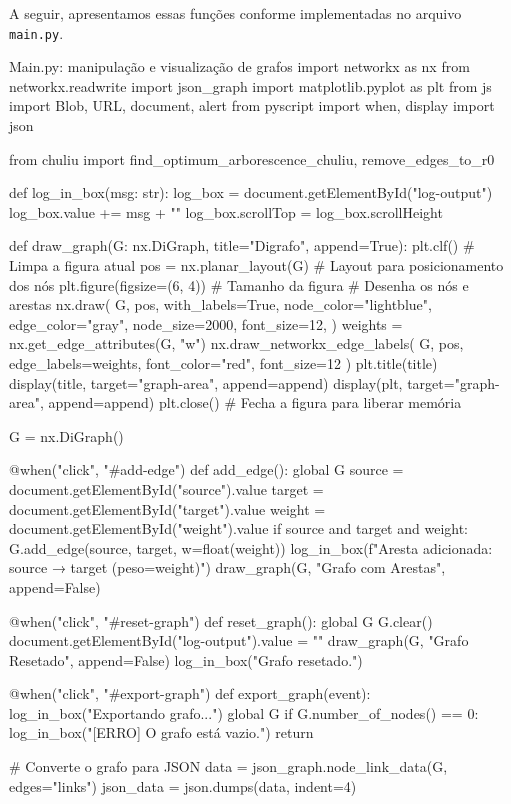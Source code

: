 A seguir, apresentamos essas funções conforme implementadas no arquivo \texttt{main.py}.

\begin{pybox}[label={lst:draw_graph}]{Main.py: manipulação e visualização de grafos}
	import networkx as nx
	from networkx.readwrite import json_graph
	import matplotlib.pyplot as plt
	from js import Blob, URL, document, alert
	from pyscript import when, display
	import json

	from chuliu import find_optimum_arborescence_chuliu, remove_edges_to_r0

	def log_in_box(msg: str):
	log_box = document.getElementById("log-output")
	log_box.value += msg + "\n"
	log_box.scrollTop = log_box.scrollHeight

	def draw_graph(G: nx.DiGraph, title="Digrafo", append=True):
	plt.clf()  # Limpa a figura atual
	pos = nx.planar_layout(G)  # Layout para posicionamento dos nós
	plt.figure(figsize=(6, 4))  # Tamanho da figura
	# Desenha os nós e arestas
	nx.draw(
	G,
	pos,
	with_labels=True,
	node_color="lightblue",
	edge_color="gray",
	node_size=2000,
	font_size=12,
	)
	weights = nx.get_edge_attributes(G, "w")
	nx.draw_networkx_edge_labels(
	G, pos, edge_labels=weights, font_color="red", font_size=12
	)
	plt.title(title)
	display(title, target="graph-area", append=append)
	display(plt, target="graph-area", append=append)
	plt.close()  # Fecha a figura para liberar memória

	G = nx.DiGraph()

	@when("click", "#add-edge")
	def add_edge():
	global G
	source = document.getElementById("source").value
	target = document.getElementById("target").value
	weight = document.getElementById("weight").value
	if source and target and weight:
	G.add_edge(source, target, w=float(weight))
	log_in_box(f"Aresta adicionada: {source} → {target} (peso={weight})")
	draw_graph(G, "Grafo com Arestas", append=False)

	@when("click", "#reset-graph")
	def reset_graph():
	global G
	G.clear()
	document.getElementById("log-output").value = ""
	draw_graph(G, "Grafo Resetado", append=False)
	log_in_box("Grafo resetado.")

	@when("click", "#export-graph")
	def export_graph(event):
	log_in_box("Exportando grafo...")
	global G
	if G.number_of_nodes() == 0:
	log_in_box("[ERRO] O grafo está vazio.")
	return

	# Converte o grafo para JSON
	data = json_graph.node_link_data(G, edges="links")
	json_data = json.dumps(data, indent=4)


\end{pybox}
